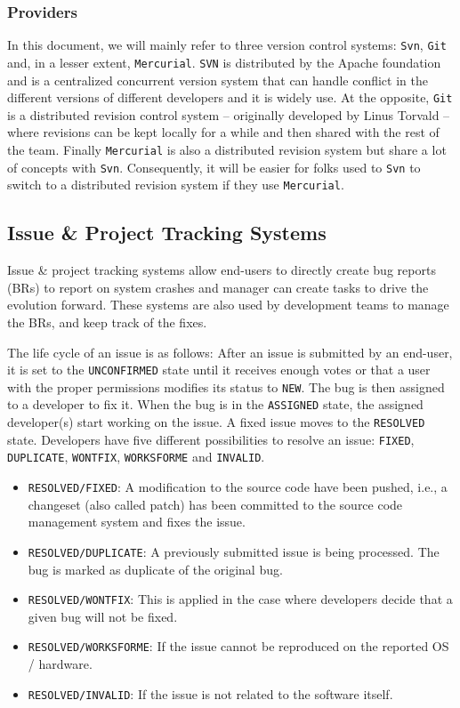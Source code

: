 \subsubsection{Providers\label{sec:revision-provider}}

In this document, we will mainly refer to three version control systems: {\tt Svn}, {\tt Git} and, in a lesser extent, {\tt Mercurial}. {\tt SVN} is distributed by the Apache foundation and is a centralized concurrent version system that can handle conflict in the different versions of different developers and it is widely use. 
At the opposite, {\tt Git} is a distributed revision control system -- originally developed by Linus Torvald -- where revisions can be kept locally for a while and then shared with the rest of the team. 
Finally {\tt Mercurial} is also a distributed revision system but share a lot of concepts with {\tt Svn}. 
Consequently, it will be easier for folks used to {\tt Svn} to switch to a distributed revision system if they use {\tt Mercurial}.

\subsection{Issue \& Project Tracking Systems\label{sec:issue-tracking}}

Issue \& project tracking systems allow end-users to directly create bug reports (BRs) to report on system crashes and manager can create tasks to drive the evolution forward.
These systems are also used by development teams to manage the BRs, and keep track of the fixes.

The life cycle of an issue is as follows: After an issue is submitted by an end-user, it is set to the {\tt UNCONFIRMED} state until it receives enough votes or that a user with the proper permissions modifies its status to {\tt NEW}.
The bug is then assigned to a developer to fix it. 
When the bug is in the {\tt ASSIGNED} state, the assigned developer(s) start working on the issue. 
A fixed issue moves to the {\tt RESOLVED} state. Developers have five different possibilities to resolve an issue: {\tt FIXED}, {\tt DUPLICATE}, {\tt WONTFIX}, {\tt WORKSFORME} and {\tt INVALID}.

\begin{itemize}
	\item {\tt RESOLVED/FIXED}: A modification to the source code have been pushed, i.e., a changeset (also called patch) has been committed to the source code management system and fixes the issue.
	\item {\tt RESOLVED/DUPLICATE}: A previously submitted issue is being processed. The bug is marked as duplicate of the original bug.
	\item {\tt RESOLVED/WONTFIX}: This is applied in the case where developers decide that a given bug will not be fixed.
	\item {\tt RESOLVED/WORKSFORME}: If the issue cannot be reproduced on the reported OS / hardware.
	\item {\tt RESOLVED/INVALID}: If the issue is not related to the software itself.
\end{itemize}

